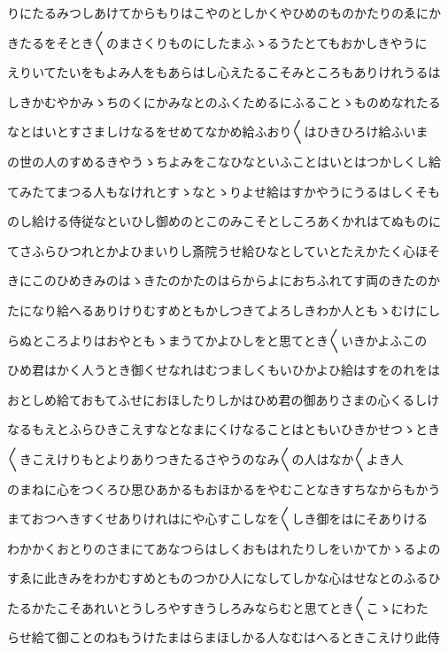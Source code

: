 \documentclass[a4paper,11pt,landscape]{ltjtarticle}
\begin{document}
りにたるみつしあけてからもりはこやのとしかくやひめのものかたりのゑにか
\par\medskip
きたるをそとき〱のまさくりものにしたまふゝるうたとてもおかしきやうに
\par\medskip
えりいてたいをもよみ人をもあらはし心えたるこそみところもありけれうるは
\par\medskip
しきかむやかみゝちのくにかみなとのふくためるにふることゝものめなれたる
\par\medskip
なとはいとすさましけなるをせめてなかめ給ふおり〱はひきひろけ給ふいま
\par\medskip
の世の人のすめるきやうゝちよみをこなひなといふことはいとはつかしくし給
\par\medskip
てみたてまつる人もなけれとすゝなとゝりよせ給はすかやうにうるはしくそも
\par\medskip
のし給ける侍従なといひし御めのとこのみこそとしころあくかれはてぬものに
\par\medskip
てさふらひつれとかよひまいりし斎院うせ給ひなとしていとたえかたく心ほそ
\par\medskip
きにこのひめきみのはゝきたのかたのはらからよにおちふれてす両のきたのか
\par\medskip
たになり給へるありけりむすめともかしつきてよろしきわか人ともゝむけにし
\par\medskip
らぬところよりはおやともゝまうてかよひしをと思てとき〱いきかよふこの
\par\medskip
ひめ君はかく人うとき御くせなれはむつましくもいひかよひ給はすをのれをは
\par\medskip
おとしめ給ておもてふせにおほしたりしかはひめ君の御ありさまの心くるしけ
\par\medskip
なるもえとふらひきこえすなとなまにくけなることはともいひきかせつゝとき
\par\medskip
〱きこえけりもとよりありつきたるさやうのなみ〱の人はなか〱よき人
\par\medskip
のまねに心をつくろひ思ひあかるもおほかるをやむことなきすちなからもかう
\par\medskip
まておつへきすくせありけれはにや心すこしなを〱しき御をはにそありける
\par\medskip
わかかくおとりのさまにてあなつらはしくおもはれたりしをいかてかゝるよの
\par\medskip
すゑに此きみをわかむすめとものつかひ人になしてしかな心はせなとのふるひ
\par\medskip
たるかたこそあれいとうしろやすきうしろみならむと思てとき〱こゝにわた
\par\medskip
らせ給て御ことのねもうけたまはらまほしかる人なむはへるときこえけり此侍
\end{document}
